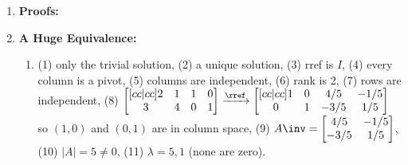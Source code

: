 {\begin{multicols}{2}
\begin{enumerate}
\begin{enumerate}
  \item 
  $|A| = 0$, row 3 is twice row 1. Since the determinant is zero, there is no inverse.
  
  
  \item The matrix of cofactors is
  $C_{ij} = 
\begin{bmatrix}
 6 & -2 & -13 \\
 -4 & 2 & 9 \\
 0 & 0 & 1
\end{bmatrix}
$. 
The adjoint is
  $\text{adj}(A) = 
\begin{bmatrix}
 6 & -4 & 0 \\
 -2 & 2 & 0 \\
 -13 & 9 & 1
\end{bmatrix}
$. Determinant is $|A|=2$.  Inverse is
$\frac{1}{|A|}\text{adj}(A)=\begin{bmatrix}
 3 & -2 & 0 \\
 -1 & 1 & 0 \\
 -\frac{13}{2} & \frac{9}{2} & \frac{1}{2}
\end{bmatrix}
$.
 


\item Each row sums to 2. Just compute $A(1,1,1,1)=(2,2,2,2)$ to show $\lambda =2$ is an eigenvalue corresponding to $(1,1,1,1)$.



\item The eigenvalues are $\lambda = 1, 3, 4$ with corresponding eigenvectors $(1,-1,0),(1,1,0),(0,0,1)$.  All three dot products are zero. Placing the three vectors into the columns of a matrix and reducing gives the identity, so they are independent.

\end{enumerate}


\item  \textbf{Proofs:} 


\item \textbf{A Huge Equivalence:}  
\begin{enumerate}
	\item 
	(1) only the trivial solution, 
	(2) a unique solution, 
	(3) rref is $I$,
	(4) every column is a pivot,
	(5) columns are independent,
	(6) rank is 2,
	(7) rows are independent,
	(8) 
	$
	\begin{bmatrix}[cc|cc] 2&1&1&0\\3&4&0&1\end{bmatrix}
	\xrightarrow{\rref}
	\begin{bmatrix}[cc|cc] 1&0&4/5&-1/5\\0&1&-3/5&1/5\end{bmatrix}
	$ so $(1,0)$ and $(0,1)$ are in column space,
	(9) $A\inv= \begin{bmatrix}4/5&-1/5\\-3/5&1/5\end{bmatrix}
$,
	(10) $|A|= 5 \neq 0 $,
	(11) $\lambda = 5, 1$ (none are zero).
	

\end{enumerate}
\end{enumerate}
\end{multicols}}
